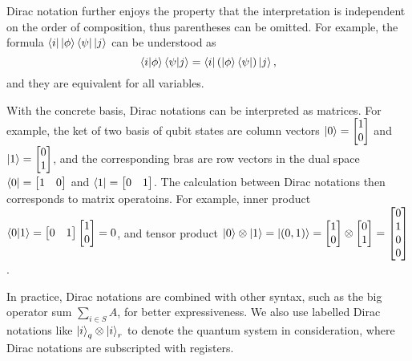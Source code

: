 \documentclass[runningheads]{llncs}
\begin{document}
Dirac notation further enjoys the property that the interpretation is independent on the order of composition, thus parentheses can be omitted. For example, the formula \(\bra{i}\ket{\phi}\bra{\psi}\ket{j}\) can be understood as
\[
    \braket{i|\phi}\braket{\psi|j} = \bra{i} (\ket{\phi}\bra{\psi}) \ket{j},
\]
and they are equivalent for all variables.

With the concrete basis, Dirac notations can be interpreted as matrices. For example, the ket of two basis of qubit states are column vectors $\ket{0} = \begin{bmatrix} 1 \\ 0 \end{bmatrix}$ and $\ket{1} = \begin{bmatrix} 0 \\ 1 \end{bmatrix}$, and the corresponding bras are row vectors in the dual space $\bra{0} = \begin{bmatrix} 1 & 0 \end{bmatrix}$ and $\bra{1} = \begin{bmatrix} 0 & 1 \end{bmatrix}$.
The calculation between Dirac notations then corresponds to matrix operatoins. For example, inner product $\braket{0| 1} = \begin{bmatrix} 0 & 1 \end{bmatrix} \begin{bmatrix} 1 \\ 0 \end{bmatrix} = 0$, and tensor product $\ket{0} \otimes \ket{1} = \ket{(0, 1)} = \begin{bmatrix} 1 \\ 0 \end{bmatrix} \otimes \begin{bmatrix} 0 \\ 1 \end{bmatrix} = \begin{bmatrix} 0 \\ 1 \\ 0 \\ 0 \end{bmatrix}$.

In practice, Dirac notations are combined with other syntax, such as the big operator sum $\sum_{i \in S} A$, for better expressiveness. We also use labelled Dirac notations like $\ket{i}_q \otimes \ket{i}_r$ to denote the quantum system in consideration, where Dirac notations are subscripted with registers.
\end{document}
